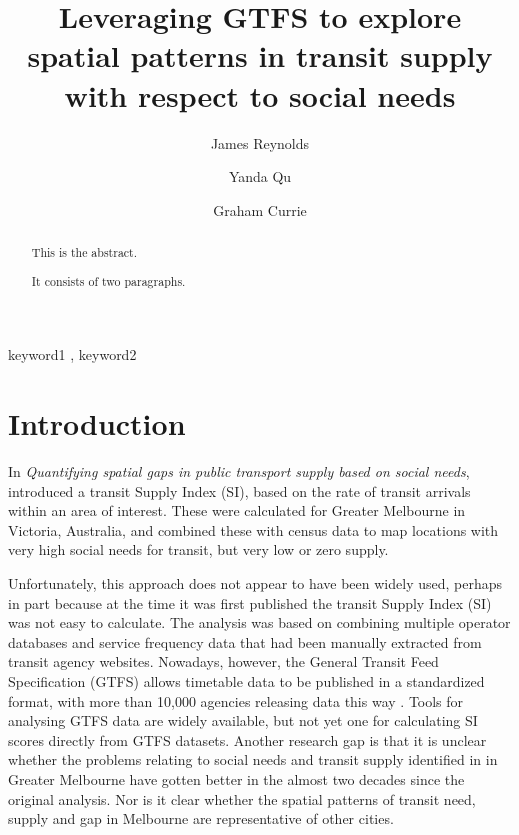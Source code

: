\documentclass[preprint, 3p,
authoryear]{elsarticle} %
\begin{document}
\begin{frontmatter}

  \title{Leveraging GTFS to explore spatial patterns in transit supply
with respect to social needs}
    \author[Public Transport Research Group (PTRG)]{James Reynolds%
  }
    \author[Public Transport Research Group (PTRG)]{Yanda Qu%
  }
    \author[Public Transport Research Group (PTRG)]{Graham Currie%
  }
  
  \begin{abstract}
  This is the abstract.

  It consists of two paragraphs.
  \end{abstract}
    \begin{keyword}
    keyword1 \sep 
    keyword2
  \end{keyword}
  
 \end{frontmatter}

\hypertarget{introduction}{%
\section{Introduction}\label{introduction}}

In \emph{Quantifying spatial gaps in public transport supply based on
social needs}, \citet{currie2010identifying} introduced a transit Supply
Index (SI), based on the rate of transit arrivals within an area of
interest. These were calculated for Greater Melbourne in Victoria,
Australia, and combined these with census data to map locations with
very high social needs for transit, but very low or zero supply.

Unfortunately, this approach does not appear to have been widely used,
perhaps in part because at the time it was first published the transit
Supply Index (SI) was not easy to calculate. The
\citet{currie2010identifying} analysis was based on combining multiple
operator databases and service frequency data that had been manually
extracted from transit agency websites. Nowadays, however, the General
Transit Feed Specification (GTFS) allows timetable data to be published
in a standardized format, with more than 10,000 agencies releasing data
this way \citep{GTFS}. Tools for analysing GTFS data are widely
available, but not yet one for calculating SI scores directly from GTFS
datasets. Another research gap is that it is unclear whether the
problems relating to social needs and transit supply identified in
\citet{currie2010identifying} in Greater Melbourne have gotten better in
the almost two decades since the original analysis. Nor is it clear
whether the spatial patterns of transit need, supply and gap in
Melbourne are representative of other cities.
\end{document}
